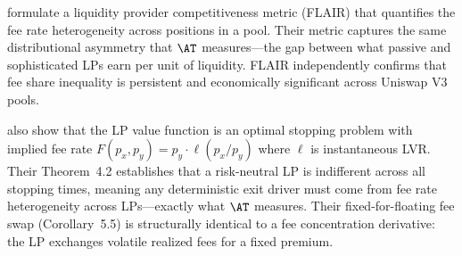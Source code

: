 \cite{bichuch2024flair} formulate a liquidity provider competitiveness metric
(FLAIR) that quantifies the fee rate heterogeneity across positions in a
pool. Their metric captures the same distributional asymmetry that $\AT$
measures---the gap between what passive and sophisticated LPs earn per unit
of liquidity. FLAIR independently confirms that fee share inequality is
persistent and economically significant across Uniswap V3 pools.

\cite{bichuch2024flair} also show that the LP value function is an optimal
stopping problem with implied fee rate
$F(p_x, p_y) = p_y \cdot \ell(p_x/p_y)$ where $\ell$ is instantaneous LVR.
Their Theorem~4.2 establishes that a risk-neutral LP is indifferent across
all stopping times, meaning any deterministic exit driver must come from fee
rate heterogeneity across LPs---exactly what $\AT$ measures. Their
fixed-for-floating fee swap (Corollary~5.5) is structurally identical to a
fee concentration derivative: the LP exchanges volatile realized fees for a
fixed premium.
